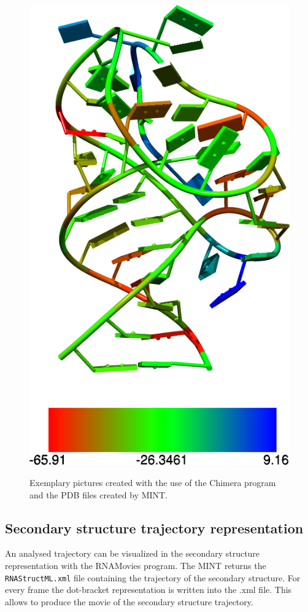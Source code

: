 \documentclass[12pt]{article}
\begin{document}
\begin{figure}[!h]
{\includegraphics[scale=0.3]{./pictures/chimera-stacking.png}}
\hspace*{\fill}%
\caption{Exemplary pictures created with the use of the Chimera program and the PDB files created by MINT.}
\label{chimera-pictures}
\end{figure}


\newpage
\newpage
\subsection{Secondary structure trajectory representation} 
An analysed trajectory can be visualized in the secondary structure representation with the RNAMovies \cite{Evers1999} program. The MINT returns the \texttt{RNAStructML.xml} file containing the trajectory of the secondary structure. For every frame the dot-bracket representation is written into the .xml file. This allows to produce the movie of the secondary structure trajectory. 
\end{document}
